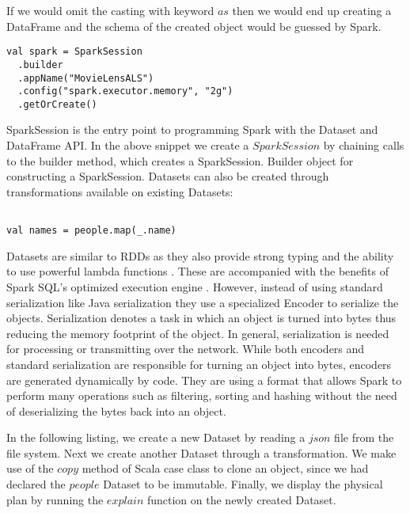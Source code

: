 \documentclass[main.tex]{thesis.tex}
\begin{document}
If we would omit the casting with keyword $as$ then we would end up creating a DataFrame and the schema of the created object would be guessed by Spark.

\begin{lstlisting}[caption=Creating a SparkSession]
val spark = SparkSession
  .builder
  .appName("MovieLensALS")
  .config("spark.executor.memory", "2g")
  .getOrCreate()
\end{lstlisting}

SparkSession is the entry point to programming Spark with the Dataset and DataFrame API. In the above snippet we create a $SparkSession$ by chaining calls to the builder method, which creates a SparkSession. Builder object for constructing a SparkSession. 
Datasets can also be created through transformations available on existing Datasets:

\begin{lstlisting}[caption=Creating a new Dataset through a transformation]

val names = people.map(_.name)

\end{lstlisting}

\cite{spark-dataset}

Datasets are similar to RDDs as they also provide strong typing and the ability to use powerful lambda functions \cite{spark-sql-programming-guide}. These are accompanied with the benefits of Spark SQL's optimized execution engine \cite{spark-sql-programming-guide}. However, instead of using standard serialization like Java serialization they use a specialized Encoder to serialize the objects.
Serialization denotes a task in which an object is turned into bytes thus reducing the memory footprint of the object.
In general, serialization is needed for processing or transmitting over the network.
While both encoders and standard serialization are responsible for turning an object into bytes, encoders are generated dynamically by code. They are using a format that allows Spark to perform many operations such as filtering, sorting and hashing without the need of deserializing the bytes back into an object. \cite{spark-programming-guide}

In the following listing, we create a new Dataset by reading a $json$ file from the file system. Next we create another Dataset through a transformation. We make use of the $copy$ method of Scala case class to clone an object, since we had declared the $people$ Dataset to be immutable. Finally, we display the physical plan by running the $explain$ function on the newly created Dataset.
\end{document}
